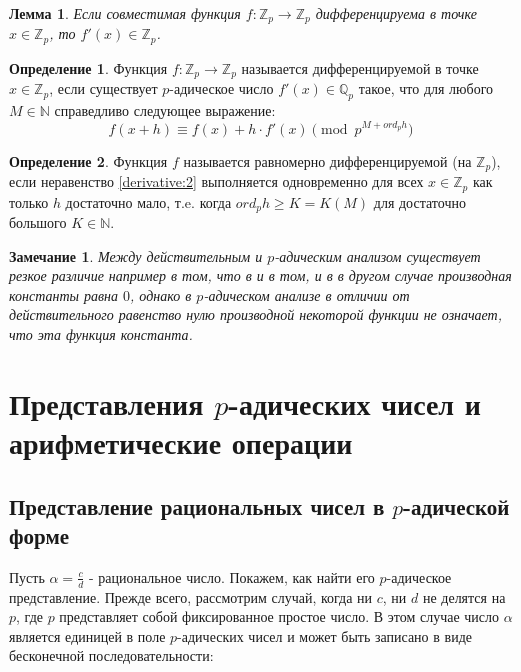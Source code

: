 \documentclass[master, och, diploma, times]{sty/SCWorks}
\theoremstyle{plain}
\newtheorem{lemma}{Лемма}[section]
\newtheorem{note}{Замечание}[section]
\theoremstyle{definition}
\newtheorem{defn}{Определение}[section]
\numberwithin{equation}{section}
\begin{document}
\begin{lemma}
Если совместимая функция $f:\mathbb {Z}_p \rightarrow \mathbb {Z}_p$ дифференцируема в точке $x \in \mathbb {Z}_p$, то $f'(x) \in \mathbb {Z}_p$.
\end{lemma}

\begin{defn}
Функция $f:\mathbb {Z}_p \rightarrow \mathbb {Z}_p$ называется дифференцируемой в точке $x \in \mathbb {Z}_p$, если существует $p$-адическое число $f'(x) \in \mathbb {Q}_p$ такое, что для любого $M \in \mathbb {N}$ справедливо следующее выражение:
\begin{equation} \label{derivative:2}
	f(x+h) \equiv f(x) + h \cdot f'(x) \pmod p^{M + ord_p h}
\end{equation}
\end{defn}

\begin{defn}
Функция $f$ называется равномерно дифференцируемой (на $\mathbb {Z}_p$), если неравенство \eqref{derivative:2} выполняется одновременно для всех $x \in \mathbb {Z}_p$ как только $h$ достаточно мало, т.e. когда $ord_p h \ge K=K(M)$ для достаточно большого $K \in \mathbb {N}$.\cite{bib:analisys:vv}
\end{defn}

\begin{note}
Между действительным и $p$-адическим анализом существует резкое различие например в том, что в и в том, и в в другом случае производная константы равна $0$, однако в $p$-адическом анализе в отличии от действительного равенство нулю производной некоторой функции не означает, что эта функция константа.\cite{bib:analysis:alain}
\end{note}

\section{Представления $p$-адических чисел и арифметические операции}

\subsection{Представление рациональных чисел в $p$-адической форме}
Пусть $\alpha=\frac{c}{d}$ - рациональное число. Покажем, как найти его $p$-адическое представление. Прежде всего, рассмотрим случай, когда ни $c$, ни $d$ не делятся на $p$, где $p$ представляет собой фиксированное простое число. В этом случае число $\alpha$ является единицей в поле $p$-адических чисел и может быть записано в виде бесконечной последовательности: 
\end{document}
